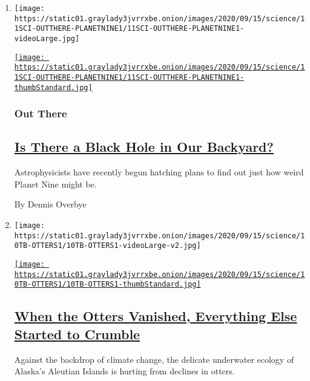 \begin{enumerate}
\def\labelenumi{\arabic{enumi}.}
\item
  \texttt{[image: https://static01.graylady3jvrrxbe.onion/images/2020/09/15/science/11SCI-OUTTHERE-PLANETNINE1/11SCI-OUTTHERE-PLANETNINE1-videoLarge.jpg]}

  \href{/2020/09/11/science/astronomy-planet-nine-black-hole.html}{\texttt{[image: https://static01.graylady3jvrrxbe.onion/images/2020/09/15/science/11SCI-OUTTHERE-PLANETNINE1/11SCI-OUTTHERE-PLANETNINE1-thumbStandard.jpg]}}

  \hypertarget{out-there}{%
  \subsubsection{Out There}\label{out-there}}

  \hypertarget{is-there-a-black-hole-in-our-backyard}{%
  \subsection{\texorpdfstring{\href{/2020/09/11/science/astronomy-planet-nine-black-hole.html}{Is
  There a Black Hole in Our
  Backyard?}}{Is There a Black Hole in Our Backyard?}}\label{is-there-a-black-hole-in-our-backyard}}

  Astrophysicists have recently begun hatching plans to find out just
  how weird Planet Nine might be.

  By Dennis Overbye
\item
  \texttt{[image: https://static01.graylady3jvrrxbe.onion/images/2020/09/15/science/10TB-OTTERS1/10TB-OTTERS1-videoLarge-v2.jpg]}

  \href{/2020/09/10/science/otters-sea-urchins-alaska.html}{\texttt{[image: https://static01.graylady3jvrrxbe.onion/images/2020/09/15/science/10TB-OTTERS1/10TB-OTTERS1-thumbStandard.jpg]}}

  \hypertarget{when-the-otters-vanished-everything-else-started-to-crumble}{%
  \subsection{\texorpdfstring{\href{/2020/09/10/science/otters-sea-urchins-alaska.html}{When
  the Otters Vanished, Everything Else Started to
  Crumble}}{When the Otters Vanished, Everything Else Started to Crumble}}\label{when-the-otters-vanished-everything-else-started-to-crumble}}

  Against the backdrop of climate change, the delicate underwater
  ecology of Alaska's Aleutian Islands is hurting from declines in
  otters.


\end{enumerate}

